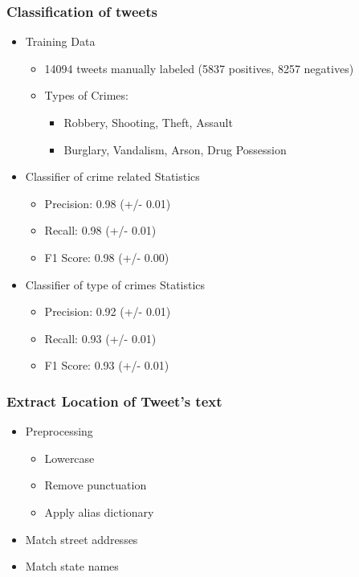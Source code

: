 \documentclass{beamer}
\begin{document}
    \begin{frame}
        \frametitle{Classification of tweets}
        \begin{itemize}
            \item<1-> Training Data
                \begin{itemize}
                    \item 14094 tweets manually labeled (5837 positives, 8257 negatives)
                    \item Types of Crimes:
                    \begin{itemize}
                        \item Robbery, Shooting, Theft, Assault
                        \item Burglary, Vandalism, Arson, Drug Possession
                    \end{itemize}
                \end{itemize}
            \item<2-> Classifier of crime related Statistics
                \begin{itemize}
                    \item Precision: 0.98 (+/- 0.01)
                    \item Recall: 0.98 (+/- 0.01)
                    \item F1 Score: 0.98 (+/- 0.00)
                \end{itemize}
            \item<3-> Classifier of type of crimes Statistics
                \begin{itemize}
                    \item Precision: 0.92 (+/- 0.01)
                    \item Recall: 0.93 (+/- 0.01) 
                    \item F1 Score: 0.93 (+/- 0.01)
                \end{itemize}
        \end{itemize}
    \end{frame}

    \begin{frame}
        \frametitle{Extract Location of Tweet's text}
        \begin{itemize}[<+->]
            \item Preprocessing
                \begin{itemize}
                    \item Lowercase
                    \item Remove punctuation
                    \item Apply alias dictionary
                \end{itemize}
            \item Match street addresses
            \item Match state names
        \end{itemize}
    \end{frame}
\end{document}
